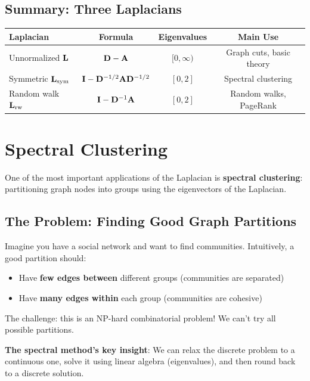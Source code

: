 \begin{notechapter}
\subsection{Summary: Three Laplacians}

\begin{center}
\begin{tabular}{lccc}
\toprule
\textbf{Laplacian} & \textbf{Formula} & \textbf{Eigenvalues} & \textbf{Main Use} \\
\midrule
Unnormalized $\mathbf{L}$ & $\mathbf{D} - \mathbf{A}$ & $[0, \infty)$ & Graph cuts, basic theory \\
Symmetric $\mathbf{L}_{\text{sym}}$ & $\mathbf{I} - \mathbf{D}^{-1/2}\mathbf{A}\mathbf{D}^{-1/2}$ & $[0, 2]$ & Spectral clustering \\
Random walk $\mathbf{L}_{\text{rw}}$ & $\mathbf{I} - \mathbf{D}^{-1}\mathbf{A}$ & $[0, 2]$ & Random walks, PageRank \\
\bottomrule
\end{tabular}
\end{center}

\section{Spectral Clustering}

One of the most important applications of the Laplacian is \textbf{spectral clustering}: partitioning graph nodes into groups using the eigenvectors of the Laplacian.

\subsection{The Problem: Finding Good Graph Partitions}

\begin{intuition}
Imagine you have a social network and want to find communities. Intuitively, a good partition should:
\begin{itemize}
    \item Have \textbf{few edges between} different groups (communities are separated)
    \item Have \textbf{many edges within} each group (communities are cohesive)
\end{itemize}

The challenge: this is an NP-hard combinatorial problem! We can't try all possible partitions.

\textbf{The spectral method's key insight}: We can relax the discrete problem to a continuous one, solve it using linear algebra (eigenvalues), and then round back to a discrete solution.
\end{intuition}


\end{notechapter}
